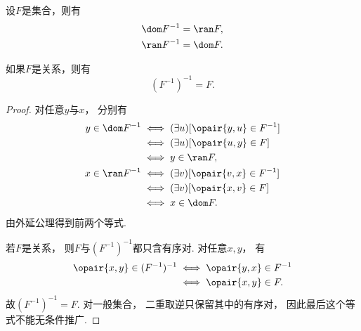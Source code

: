 \begin{theorem}\label{theorem:集合论.关系的逆的定义域值域以及关系的二重逆}
    设\(F\)是集合，则有
    \begin{gather}
        \dom F^{-1} = \ran F, \\
        \ran F^{-1} = \dom F.
    \end{gather}

    如果\(F\)是关系，则有
    \begin{equation}
        (F^{-1})^{-1} = F.
    \end{equation}
    \begin{proof}
        对任意\(y\)与\(x\)，
        分别有
        \begin{align*}
            y\in\dom F^{-1}
            &\iff(\exists u)[\opair{y,u}\in F^{-1}] \\
            &\iff(\exists u)[\opair{u,y}\in F] \\
            &\iff y\in\ran F, \\
            x\in\ran F^{-1}
            &\iff(\exists v)[\opair{v,x}\in F^{-1}] \\
            &\iff(\exists v)[\opair{x,v}\in F] \\
            &\iff x\in\dom F.
        \end{align*}
        由外延公理得到前两个等式.

        若\(F\)是关系，
        则\(F\)与\((F^{-1})^{-1}\)都只含有序对.
        对任意\(x,y\)，
        有
        \begin{align*}
            \opair{x,y}\in(F^{-1})^{-1}
            &\iff\opair{y,x}\in F^{-1} \\
            &\iff\opair{x,y}\in F.
        \end{align*}
        故\((F^{-1})^{-1}=F\).
        对一般集合，
        二重取逆只保留其中的有序对，
        因此最后这个等式不能无条件推广.
    \end{proof}
\end{theorem}

